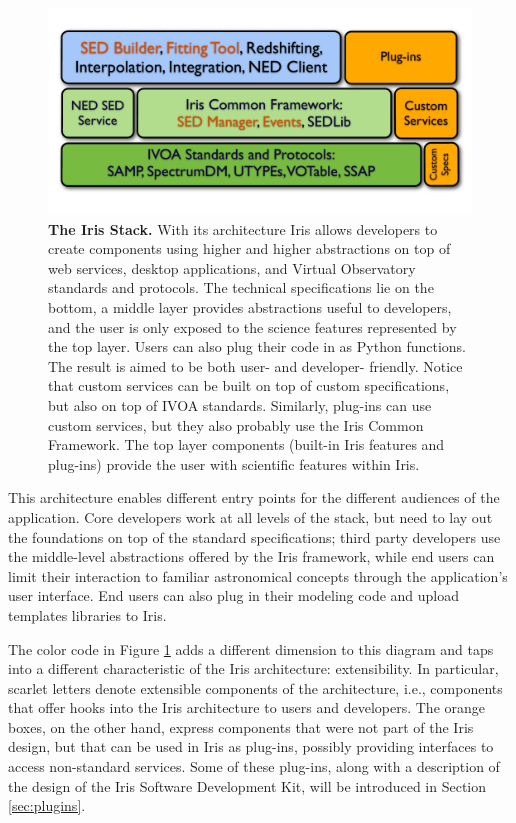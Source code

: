 \documentclass[preprint,authoryear,5p]{elsarticle}
\begin{document}
\begin{figure}
\begin{center}
\includegraphics[width=1.0\columnwidth]{IrisStack.pdf} \caption{\textbf{The
Iris Stack.}  With its architecture Iris allows developers to create components
using higher and higher abstractions on top of web services, desktop
applications, and Virtual Observatory standards and protocols.
The technical
specifications lie on the bottom, a middle layer provides abstractions useful to
developers, and the user is only exposed to the science features represented by the top layer.
Users can also
plug their code in as Python functions. The result is aimed to be both user- and
developer- friendly. Notice that custom services can be built on top of custom specifications,
but also on top of IVOA standards. Similarly, plug-ins can use custom services, but they also
probably use the Iris Common Framework. The top layer components
(built-in Iris features and plug-ins) provide the user with scientific features within Iris.}
\label{fig:stack}
\end{center}
\end{figure}

This architecture enables different entry points for the different audiences of the
application. Core developers work at all levels of the stack, but need to lay
out the foundations on top of the standard specifications; third party
developers use the middle-level abstractions offered by the Iris framework,
while end users can limit their interaction to familiar astronomical concepts
through the application's user interface. End users can also plug in their
modeling code and upload templates libraries to Iris.

The color code in Figure \ref{fig:stack} adds a different dimension to this
diagram and taps into a different characteristic of the Iris architecture:
extensibility. In particular, scarlet letters denote extensible
components of the architecture, i.e., components that offer hooks into the Iris
architecture to users and developers. The orange boxes, on the other hand,
express components that were not part of the Iris design, but that can be
used in Iris as plug-ins, possibly providing interfaces to access
non-standard services. Some of these plug-ins, along with a description of the
design of the Iris Software Development Kit, will be introduced in Section
\ref{sec:plugins}.
\end{document}
